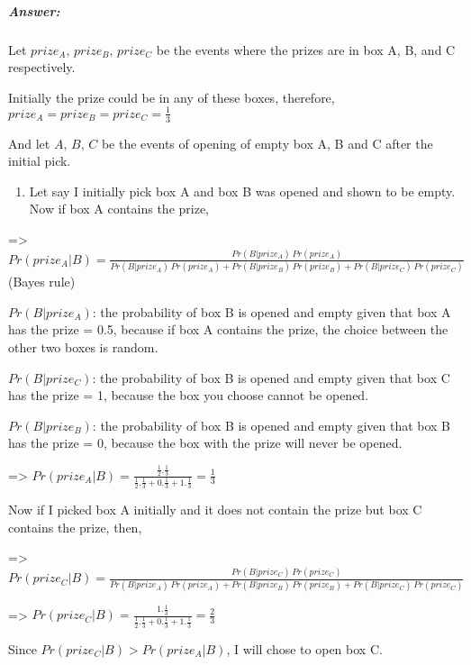 \documentclass[11pt]{article}
\providecommand{\tightlist}{%
      \setlength{\itemsep}{0pt}\setlength{\parskip}{0pt}}
\begin{document}
    \hypertarget{answer}{%
\subparagraph{Answer:}\label{answer}}

Let \(prize_A, \, prize_B, \, prize_C\) be the events where the prizes
are in box A, B, and C respectively.

Initially the prize could be in any of these boxes, therefore,
\(prize_A = prize_B = prize_C = \frac{1}{3}\)

And let \(A, \, B, \, C\) be the events of opening of empty box A, B and
C after the initial pick.

\begin{enumerate}
\def\labelenumi{\alph{enumi})}
\tightlist
\item
  Let say I initially pick box A and box B was opened and shown to be
  empty. Now if box A contains the prize,
\end{enumerate}

=\textgreater{}
\(Pr (prize_A | B) = \frac{Pr (B | prize_A) \, Pr (prize_A)}{Pr (B | prize_A) \, Pr (prize_A) + Pr (B | prize_B) \, Pr (prize_B) + Pr (B | prize_C) \, Pr (prize_C)}\)
(Bayes rule)

\(Pr (B | prize_A)\): the probability of box B is opened and empty given
that box A has the prize = 0.5, because if box A contains the prize, the
choice between the other two boxes is random.

\(Pr (B | prize_C)\): the probability of box B is opened and empty given
that box C has the prize = 1, because the box you choose cannot be
opened.

\(Pr (B | prize_B)\): the probability of box B is opened and empty given
that box B has the prize = 0, because the box with the prize will never
be opened.

=\textgreater{}
\(Pr (prize_A | B) = \frac{\frac{1}{2} . \frac{1}{3}}{\frac{1}{2} . \frac{1}{3} + 0 . \frac{1}{3} + 1 . \frac{1}{3}} = \frac{1}{3}\)

Now if I picked box A initially and it does not contain the prize but
box C contains the prize, then,

=\textgreater{}
\(Pr (prize_C | B) = \frac{Pr (B | prize_C) \, Pr (prize_C)}{Pr (B | prize_A) \, Pr (prize_A) + Pr (B | prize_B) \, Pr (prize_B) + Pr (B | prize_C) \, Pr (prize_C)}\)

=\textgreater{}
\(Pr (prize_C | B) = \frac{1 . \frac{1}{3}}{\frac{1}{2} . \frac{1}{3} + 0 . \frac{1}{3} + 1 . \frac{1}{3}} = \frac{2}{3}\)

Since \(Pr (prize_C | B) > Pr (prize_A | B)\), I will chose to open box
C.
\end{document}
